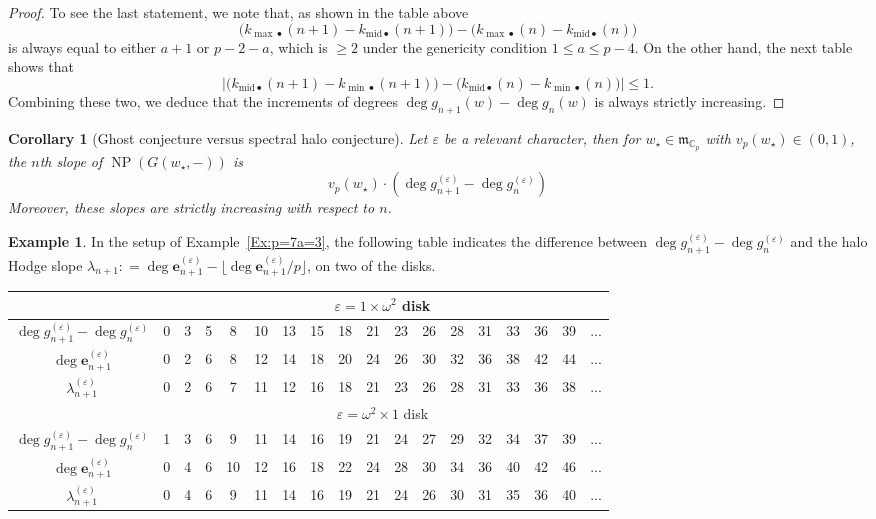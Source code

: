 \documentclass[12pt]{amsart}
\newtheorem{corollary}[subsection]{Corollary}
\theoremstyle{definition}
\newtheorem{example}[subsection]{Example}
\numberwithin{equation}{subsection}
\def\gothm{\mathfrak{m}}
\def\CC{\mathbb{C}}
\def\bfe{\mathbf{e}}
\DeclareMathOperator{\NP}{NP}
\newcommand{\midd}{\mathrm{mid}}
\begin{document}
\begin{proof}
To see the last statement, we note that, as shown in the table above 
$$\big( k_{{\max}\bullet}(n+1) - k_{\midd\bullet}(n+1)\big) - \big(  k_{{\max}\bullet}(n) - k_{\midd\bullet}(n)\big)$$ is always equal to either $a+1$ or $p-2-a$, which is $\geq 2$ under the genericity condition $1\leq a \leq p-4$. On the other hand, the next table shows that
$$
\Big|\big(k_{{\midd}\bullet}(n+1) - k_{{\min}\bullet}(n+1)\big) - \big(  k_{{\midd}\bullet}(n) - k_{{\min}\bullet}(n)\big)\Big| \leq 1.
$$
Combining these two, we deduce that the increments of degrees $\deg g_{n+1}(w)-\deg g_n(w)$ is always strictly increasing.
\end{proof}


\begin{corollary}[Ghost conjecture versus spectral halo conjecture]
\label{C:ghost versus halo}
Let $\varepsilon$ be a relevant character, then for $w_\star \in \gothm_{\CC_p}$ with $v_p(w_\star) \in (0,1)$, the $n$th slope of $\NP(G(w_\star, -))$ is
$$
v_p(w_\star) \cdot (\deg g_{n+1}^{(\varepsilon)}-\deg g_n^{(\varepsilon)})
$$
Moreover, these slopes are strictly increasing with respect to $n$.
\end{corollary}


\begin{example}
\label{E:halo bound vs g}
In the setup of Example~\ref{Ex:p=7a=3}, the following table indicates the difference between $\deg g_{n+1}^{(\varepsilon)}- \deg g_{n}^{(\varepsilon)}$ and the halo Hodge slope $\lambda_{n+1} : = \deg \bfe_{n+1}^{(\varepsilon)} - \big\lfloor \deg \bfe_{n+1}^{(\varepsilon)} / p\big\rfloor$, on two of the disks.

\begin{center}
\begin{tabular}{|c|c|c|c|c|c|c|c|c|c|c|c|c|c|c|c|c|c|}
\hline
& \multicolumn{17}{|c|}{$\varepsilon = 1\times \omega^2$ disk}
\\
\hline
$\deg g_{n+1}^{(\varepsilon)}- \deg g_{n}^{(\varepsilon)}$  & 0 & 3 & 5 & 8 & 10 & 13 & 15 & 18 & 21 & 23 & 26 & 28&31&33&36 & 39& ... \\ \hline
$\deg \bfe_{n+1}^{(\varepsilon)}$ &  0 & 2 & 6 & 8 & 12 & 14 & 18 & 20 & 24&26&30&32&36&38&42&44& ...
\\
 \hline
$\lambda_{n+1}^{(\varepsilon)}$  & 0 & 2 & 6 & 7 & 11 & 12 & 16 & 18 & 21 & 23 & 26 & 28&31&33&36 & 38& ...
\\ \hline
& \multicolumn{17}{|c|}{$\varepsilon= \omega^2 \times 1$ disk}
\\
\hline
$\deg g_{n+1}^{(\varepsilon)}- \deg g_{n}^{(\varepsilon)}$  &1 & 3 & 6 & 9 & 11 & 14 & 16 & 19 &21&24&27&29&32&34&37&39& ...
\\ \hline
$\deg \bfe^{(\varepsilon)}_{n+1}$ & 0 & 4 & 6 & 10 & 12 & 16 & 18 & 22 &24&28&30&34&36&40& 42 &46& ...
\\ \hline
$\lambda_{n+1}^{(\varepsilon)}$  & 0 & 4 & 6 & 9 & 11 & 14 & 16 & 19 &21&24&26&30&31&35&36&40& ...
\\ \hline
\end{tabular}
\end{center}
\end{example}
\end{document}
